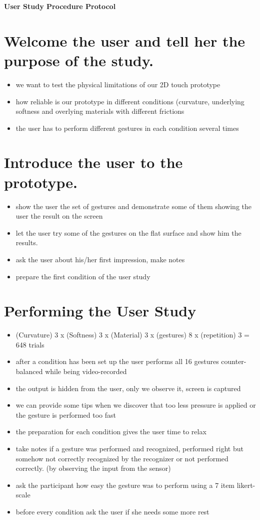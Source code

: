 \documentclass[10pt,a4paper]{article}
\begin{document}
\begin{center}
\textbf{User Study Procedure Protocol}
\end{center}
\section{Welcome the user and tell her the purpose of the study.}

\begin{itemize}
\item we want to test the physical limitations of our 2D touch prototype
\item how reliable is our prototype in different conditions (curvature, underlying softness and overlying materials with different frictions
\item the user has to perform different gestures in each condition several times
\end{itemize}

\section{Introduce the user to the prototype.}
\begin{itemize}
\item show the user the set of gestures and demonstrate some of them showing the user the result on the screen
\item let the user try some of the gestures on the flat surface and show him the results.
\item ask the user about his/her first impression, make notes
\item prepare the first condition of the user study
\end{itemize}

\section{Performing the User Study}
\begin{itemize}
\item (Curvature) 3 x (Softness) 3 x (Material) 3 x (gestures) 8 x (repetition) 3 = 648 trials
\item after a condition has been set up the user performs all  16 gestures counter-balanced while being video-recorded
\item the output is hidden from the user, only we observe it, screen is captured
\item we can provide some tips when we discover that too less pressure is applied or the gesture is performed too fast
\item the preparation for each condition gives the user time to relax
\item take notes if a gesture was performed and recognized, performed right but somehow not correctly recognized by the recognizer or not performed correctly. (by observing the input from the sensor)
\item ask the participant how easy the gesture was to perform using a 7 item likert-scale
\item before every condition ask the user if she needs some more rest
\end{itemize}
\end{document}
